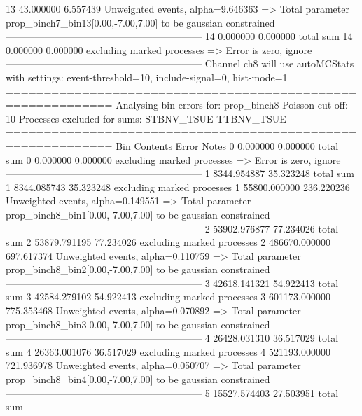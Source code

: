 13         43.000000       6.557439        Unweighted events, alpha=9.646363
  => Total parameter prop_binch7_bin13[0.00,-7.00,7.00] to be gaussian constrained
------------------------------------------------------------
14         0.000000        0.000000        total sum                     
14         0.000000        0.000000        excluding marked processes    
  => Error is zero, ignore      
------------------------------------------------------------
Channel ch8 will use autoMCStats with settings: event-threshold=10, include-signal=0, hist-mode=1
============================================================
Analysing bin errors for: prop_binch8
Poisson cut-off: 10
Processes excluded for sums: STBNV_TSUE TTBNV_TSUE
============================================================
Bin        Contents        Error           Notes                         
0          0.000000        0.000000        total sum                     
0          0.000000        0.000000        excluding marked processes    
  => Error is zero, ignore      
------------------------------------------------------------
1          8344.954887     35.323248       total sum                     
1          8344.085743     35.323248       excluding marked processes    
1          55800.000000    236.220236      Unweighted events, alpha=0.149551
  => Total parameter prop_binch8_bin1[0.00,-7.00,7.00] to be gaussian constrained
------------------------------------------------------------
2          53902.976877    77.234026       total sum                     
2          53879.791195    77.234026       excluding marked processes    
2          486670.000000   697.617374      Unweighted events, alpha=0.110759
  => Total parameter prop_binch8_bin2[0.00,-7.00,7.00] to be gaussian constrained
------------------------------------------------------------
3          42618.141321    54.922413       total sum                     
3          42584.279102    54.922413       excluding marked processes    
3          601173.000000   775.353468      Unweighted events, alpha=0.070892
  => Total parameter prop_binch8_bin3[0.00,-7.00,7.00] to be gaussian constrained
------------------------------------------------------------
4          26428.031310    36.517029       total sum                     
4          26363.001076    36.517029       excluding marked processes    
4          521193.000000   721.936978      Unweighted events, alpha=0.050707
  => Total parameter prop_binch8_bin4[0.00,-7.00,7.00] to be gaussian constrained
------------------------------------------------------------
5          15527.574403    27.503951       total sum                     
